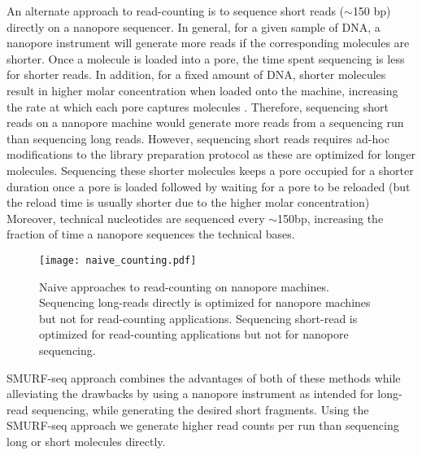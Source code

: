 An alternate approach to read-counting is to sequence short reads
($\sim$150 bp) directly on a nanopore sequencer.
In general, for a given sample of DNA, a nanopore instrument will
generate more reads if the corresponding molecules are shorter.  Once a
molecule is loaded into a pore, the time spent sequencing is less for
shorter reads. In addition, for a fixed amount of DNA, shorter molecules
result in higher molar concentration when loaded onto the machine,
increasing the rate at which each pore captures molecules
\citep{muthukumar2010theory,wanunu2008dna}. Therefore, sequencing short
reads on a nanopore machine would generate more reads from a sequencing
run than sequencing long reads.
However, sequencing short reads requires ad-hoc modifications to the
library preparation protocol as these are optimized for longer
molecules.  Sequencing these shorter molecules keeps a pore occupied for
a shorter duration once a pore is loaded followed by waiting for a pore
to be reloaded (but the reload time is usually shorter due to the higher
molar concentration) Moreover, technical nucleotides are sequenced every
$\sim$150bp, increasing the fraction of time a nanopore sequences the
technical bases.

\begin{figure}[t!]
\centering
\texttt{[image: naive\_counting.pdf]}
\caption[Naive approaches to read-counting on nanopore machines]{
  Naive approaches to read-counting on nanopore machines.
  Sequencing long-reads directly is optimized for nanopore machines but
  not for read-counting applications.
  Sequencing short-read is optimized for read-counting applications but
  not for nanopore sequencing.}
\label{smurf}
\end{figure}

SMURF-seq approach combines the advantages of both of these methods
while alleviating the drawbacks by using a nanopore instrument as
intended for long-read sequencing, while generating the desired short
fragments. Using the SMURF-seq approach we generate higher read counts
per run than sequencing long or short molecules directly.


